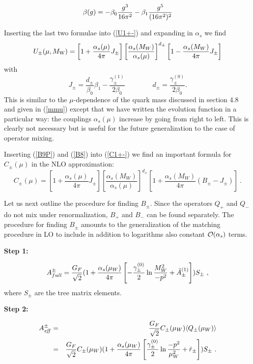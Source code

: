 \documentclass[12pt]{article}
\def\as{\alpha_s}
\newcommand{\mw}{M_{\rm W}}
\newcommand{\ord}{{\cal O}}
\begin{document}
\begin{itemize}
\begin{itemize}
\begin{itemize}
\begin{equation}\label{bg01P}
\beta(g)=-\beta_0{g^3\over 16\pi^2}-\beta_1{g^5\over (16\pi^2)^2}
  \end{equation}

Inserting the last two formulae into (\ref{U1+-}) and expanding in
$\alpha_s$ we find
\begin{equation}\label{B9P}
U_\pm(\mu,\mw)=\left[1+\frac{\as(\mu)}{4\pi}J_\pm\right]
      \left[\frac{\as(M_W)}{\as(\mu)}\right]^{d_\pm}
\left[1-\frac{\as(M_W)}{4\pi} J_\pm\right]
\end{equation}
with
\begin{equation}\label{B10P}
J_\pm=\frac{d_\pm}{\beta_0}\beta_1-\frac{\gamma^{(1)}_\pm}{2\beta_0}
\qquad\qquad
d_\pm=\frac{\gamma^{(0)}_\pm}{2\beta_0}.
\end{equation}
This is similar to the $\mu$-dependence of the quark mass discussed
in section 4.8 and given in (\ref{mmu}) except that we have 
written the evolution function
in a particular way: the couplings $\as(\mu)$ increase by going from
right to left. This is clearly not necessary but is useful for the
future generalization to the case of operator mixing.

Inserting (\ref{B9P}) and (\ref{B8}) into (\ref{C1+-}) we find
an important formula for $C_\pm(\mu)$ in the NLO approximation:
\begin{equation}\label{B9PP}
C_\pm(\mu)=\left[1+\frac{\as(\mu)}{4\pi}J_\pm\right]
      \left[\frac{\as(M_W)}{\as(\mu)}\right]^{d_\pm}
\left[1+\frac{\as(M_W)}{4\pi}(B_\pm-J_\pm)\right]~.
\end{equation}

Let us next outline the procedure for finding $B_\pm$.
Since the operators $Q_+$ and $Q_-$ do not mix under renormalization,
$B_+$ and $B_-$ can be found separately. 
The procedure for finding $B_\pm$ amounts to the generalization of
the matching procedure in
LO to include in addition to logarithms also
constant $\ord (\as)$ terms.

{\bf Step 1:}

\begin{equation}\label{amp2}
A^\pm_{full} =
{G_F\over\sqrt{2}}(1+{\as(\mu_W)\over 4\pi}\left[-{{\gamma^{(0)}_\pm}\over 2}
\ln{M^2_W\over -p^2}+\tilde A^{(1)}_\pm\right]) S_\pm~,  \end{equation}
where $S_\pm$ are the tree matrix elements.

{\bf Step 2:}

\vspace{-0.41truecm}
\begin{eqnarray}\label{aef2}
A^\pm_{\it eff}&=&{G_F\over\sqrt{2}}C_\pm (\mu_W)\langle Q_\pm(\mu_W)\rangle \\
&=&{G_F\over\sqrt{2}}C_\pm(\mu_W)
(1+{\as(\mu_W)\over 4\pi}\left[{{\gamma^{(0)}_\pm}\over 2}
 \ln{-p^2\over\mu^2_W}+\tilde r_\pm
 \right])S_\pm~.   \nonumber
\end{eqnarray}


\end{itemize}
\end{itemize}
\end{itemize}
\end{document}
